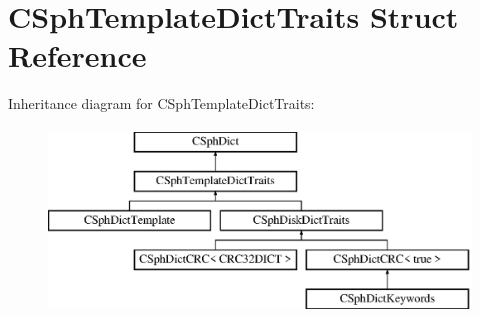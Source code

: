 \hypertarget{structCSphTemplateDictTraits}{\section{C\-Sph\-Template\-Dict\-Traits Struct Reference}
\label{structCSphTemplateDictTraits}
}
Inheritance diagram for C\-Sph\-Template\-Dict\-Traits\-:\begin{figure}[H]
\begin{center}
\leavevmode
\includegraphics[height=4.886562cm]{structCSphTemplateDictTraits}
\end{center}
\end{figure}
